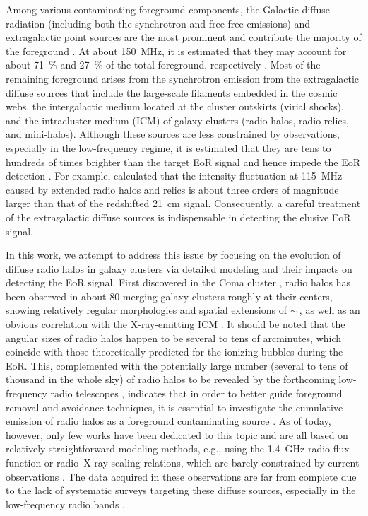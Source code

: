 \documentclass[modern]{aastex62}
\begin{document}
Among various contaminating foreground components, the Galactic diffuse
radiation (including both the synchrotron and free-free emissions)
and extragalactic point sources are the most prominent and contribute
the majority of the foreground
\citep[e.g.,][]{shaver1999,diMatteo2004,gleser2008,liu2012,murray2017,spinelli2018}.
At about \SI{150}{\MHz}, it is estimated that they may account for
about \SI{71}{\percent} and \SI{27}{\percent} of the total foreground,
respectively \citep{shaver1999}.
Most of the remaining foreground arises from the synchrotron emission
from the extragalactic diffuse sources that include the large-scale
filaments embedded in the cosmic webs,
the intergalactic medium located at the cluster outskirts (virial shocks),
and the intracluster medium (ICM) of galaxy clusters (radio halos,
radio relics, and mini-halos).
Although these sources are less constrained by observations, especially
in the low-frequency regime, it is estimated that they are tens to
hundreds of times brighter than the target EoR signal and hence impede
the EoR detection \citep[e.g.,][]{waxman2000,diMatteo2004,gleser2008}.
For example, \citet{diMatteo2004} calculated that the intensity
fluctuation at \SI{115}{\MHz} caused by extended radio halos and relics
is about three orders of magnitude larger than that of the redshifted
21~cm signal.
Consequently, a careful treatment of the extragalactic diffuse sources
is indispensable in detecting the elusive EoR signal.

In this work, we attempt to address this issue by focusing on the
evolution of diffuse radio halos in galaxy clusters via detailed
modeling and their impacts on detecting the EoR signal.
First discovered in the Coma cluster \citep{large1959}, radio halos
has been observed in about 80 merging galaxy clusters roughly at
their centers, showing relatively regular morphologies and spatial
extensions of $\sim\,$\si{\Mpc}, as well as an obvious correlation
with the X-ray-emitting ICM \citep[e.g.,][]{cassano2013}.
It should be noted that the angular sizes of radio halos happen to be
several to tens of arcminutes, which coincide with those theoretically
predicted for the ionizing bubbles during the EoR.
This, complemented with the potentially large number
(several to tens of thousand in the whole sky)
of radio halos to be revealed by the forthcoming
low-frequency radio telescopes \citep[e.g.,][]{cassano2015},
indicates that in order to better guide foreground removal and avoidance
techniques, it is essential to investigate the cumulative emission
of radio halos as a foreground contaminating source
\citep[e.g.,][]{diMatteo2004,gleser2008}.
As of today, however, only few works have been dedicated to this topic
and are all based on relatively straightforward modeling methods,
e.g., using the \SI{1.4}{\GHz} radio flux function or radio--X-ray
scaling relations, which are barely constrained by current observations
\citep[e.g.,][]{gleser2008,jelic2008}.
The data acquired in these observations are far from complete due to
the lack of systematic surveys targeting these diffuse sources,
especially in the low-frequency radio bands \citep[e.g.,][]{kale2016rev}.
\end{document}
